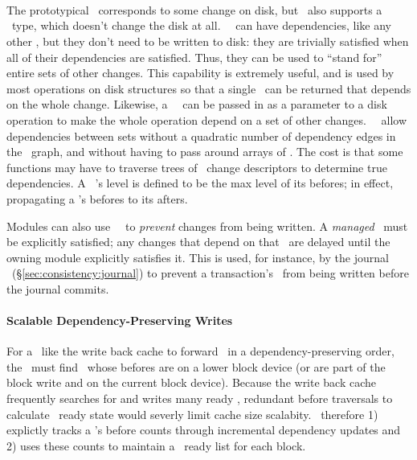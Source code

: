 \paragraph{\Noop\ \ChDescs}
\label{sec:design:chdescs:noop}
The prototypical \chdesc\ corresponds to some change on disk, but \Kudos\
 also supports a \emph{\noop} \chdesc\ type, which doesn't change the disk
 at all.
%
%
\Noop\ \chdescs\ can have dependencies, like any other
\chdesc, but they don't need to be written to disk:  they are trivially satisfied when all of their dependencies are
satisfied.
%
Thus, they can be used to ``stand for'' entire sets of other changes.
%
This capability is extremely useful, and is used by most operations on disk
structures so that a single \chdesc\ can be returned that depends on the whole
change. Likewise, a \noop\ \chdesc\ can be passed in as a parameter to a disk
operation to make the whole operation depend on a set of other changes. \Noop\
\chdescs\ allow dependencies between sets without a quadratic number
of dependency edges in the \chdesc\ graph, and without having to pass around
arrays of \chdescs.
%
The cost is that some functions may have to traverse trees of \noop\ change
 descriptors to determine true dependencies.
%
A \noop\ \chdesc's level is defined to be the max level of its befores;
in effect, propagating a \noop's befores to its afters.

Modules can also use \noop\ \chdescs\ to \emph{prevent} changes from being
 written.
%
A \emph{managed} \noop\ must be explicitly satisfied; any changes that
 depend on that \noop\ are delayed until the owning module explicitly
 satisfies it.
%
This is used, for instance, by the journal \module\
 (\S\ref{sec:consistency:journal}) to prevent a transaction's \chdescs\
 from being written before the journal commits.

\paragraph{Scalable Dependency-Preserving Writes}
For a \module\ like the write back cache to forward \chdescs\ in a
dependency-preserving order, the \module\ must find \chdescs\ whose
befores are on a lower block device (or are part of the block write
and on the current block device). Because the write back cache
frequently searches for and writes many ready \chdescs{}, redundant
before traversals to calculate \chdesc\ ready state would severly
limit cache size scalabity.
%
\Kudos\ therefore
%
1) explictly tracks a \chdesc{}'s before counts through incremental
dependency updates
%
and 2) uses these counts to maintain a \chdesc\ ready list for each
block.

